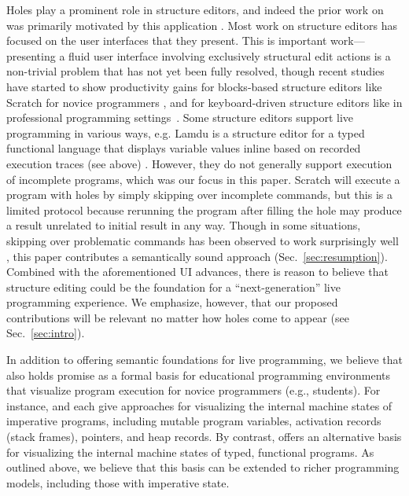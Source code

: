 Holes play a prominent role in structure editors, and indeed the prior work on \Hazelnut was primarily motivated by this application \cite{popl-paper}. 
Most work on structure editors has focused on the user interfaces that they
present. This is important work---presenting a fluid user interface involving
exclusively structural edit actions is a non-trivial problem that has not yet
been fully resolved, though recent studies have started to show productivity
gains for blocks-based structure editors like Scratch for novice programmers \cite{Resnick:2009:SP:1592761.1592779,DBLP:conf/chi/WeintropASFLSF18,DBLP:conf/acmidc/WeintropW15}, and for keyboard-driven structure
editors like  in professional programming settings~\cite{DBLP:conf/vl/Asenov014,DBLP:conf/sle/VolterSBK14,voelter_mbeddr:_2012}.
%
Some structure editors support live programming in various ways, e.g. Lamdu is a structure editor for a typed functional language that displays variable values inline based on recorded execution traces (see above) \cite{lamdu}. However, they do not generally support execution of incomplete programs, which was our focus in this paper. Scratch will execute a program with holes by simply skipping over incomplete commands, but this is a limited protocol because rerunning the program after filling the hole may produce a result unrelated to initial result in any way. Though in some situations, skipping over problematic commands has been observed to work surprisingly well \cite{DBLP:conf/dac/Rinard12}, this paper contributes a semantically sound approach (Sec.~\ref{sec:resumption}). Combined with the aforementioned UI advances, there is reason to believe that structure editing could be the foundation for a ``next-generation'' live programming experience. We emphasize, however,   
that our proposed contributions will be relevant no matter how holes come to appear (see Sec.~\ref{sec:intro}). %

In addition to offering semantic foundations for live programming, we
believe that \HazelnutLive also holds promise as a formal basis for
educational programming environments that visualize program execution
for novice programmers (e.g., students).
%
For instance, \citet{Nelson2017} and \citet{Guo13} each give
approaches for visualizing the internal machine states of imperative
programs, including mutable program variables, activation records
(stack frames), pointers, and heap records.
%
By contrast, \HazelnutLive offers an alternative basis for visualizing
the internal machine states of typed, functional programs.
%
As outlined above, we believe that this basis can be extended to
richer programming models, including those with imperative state.


